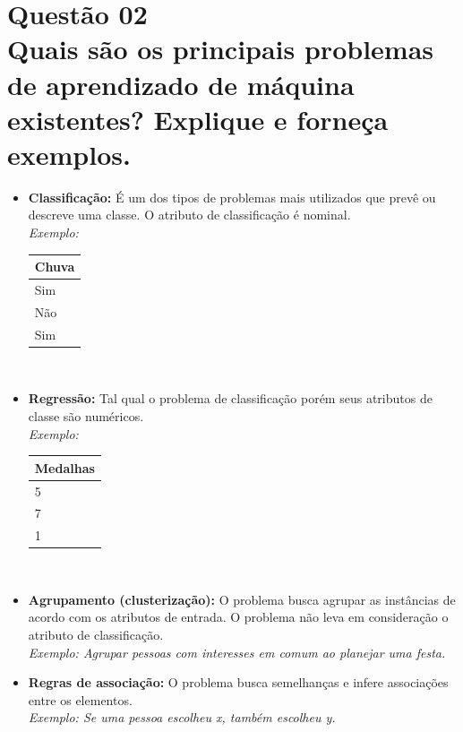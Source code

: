 \documentclass[12pt]{article}
\begin{document}
\section{Questão 02\\
Quais são os principais problemas de aprendizado de máquina existentes? Explique e
forneça exemplos.
}
\begin{itemize}
    \item \textbf{Classificação:} É um dos tipos de problemas mais utilizados que prevê ou descreve uma classe.
    O atributo de classificação é nominal.\\ 
    \textit{Exemplo:}\\

        \begin{tabular}{ l }
            \textbf{Chuva}\\
            \hline
          Sim \\ \hline
          Não \\ \hline
          Sim \\
          \hline
        \end{tabular}\\

    \item \textbf{Regressão:}
    Tal qual o problema de classificação porém seus atributos de classe são numéricos.\\
    \textit{Exemplo:}\\

    \begin{tabular}{ l }
        \textbf{Medalhas}\\
        \hline
      5 \\ \hline
      7 \\ \hline
      1 \\
      \hline
    \end{tabular}\\
    \item \textbf{Agrupamento (clusterização):}
    O problema busca agrupar as instâncias de acordo com os atributos de entrada.
    O problema não leva em consideração o atributo de classificação.\\
    \textit{Exemplo: Agrupar pessoas com interesses em comum ao planejar uma festa.}
    \item \textbf{Regras de associação:}
    O problema busca semelhanças e infere associações entre os elementos.\\
    \textit{Exemplo: Se uma pessoa escolheu x, também escolheu y.}

\end{itemize}
\end{document}
